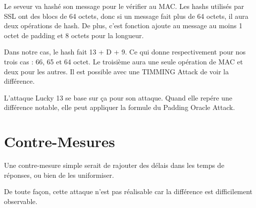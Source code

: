 Le seveur va hashé son message pour le vérifier au MAC. Les hashs utilisés par SSL
ont des blocs de 64 octets, donc si un message fait plus de 64 octets, il aura deux
opérations de hash. De plus, c'est fonction ajoute au message au moins 1 octet de 
padding et 8 octets pour la longueur.

Dans notre cas, le hash fait 13 + D + 9. Ce qui donne respectivement pour nos trois cas :
66, 65 et 64 octet. Le troisième aura une seule opération de MAC et deux pour les autres.
Il est possible avec une TIMMING Attack de voir la différence. 

L'attaque Lucky 13 se base sur ça pour son attaque. Quand elle repére une différence
notable, elle peut appliquer la formule du Padding Oracle Attack.

\section{Contre-Mesures}
\label{sec:cmL13}

Une contre-mesure simple serait de rajouter des délais dans les temps de réponses,
ou bien de les uniformiser.

De toute façon, cette attaque n'est pas réalisable car la différence est difficilement observable. 
